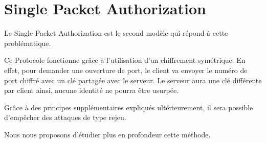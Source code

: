 \chapter{Single Packet Authorization}

Le Single Packet Authorization est le second modèle qui répond à cette problématique.

Ce Protocole fonctionne grâce à l'utilisation d'un chiffrement symétrique. En effet, pour demander une ouverture de port, le client va envoyer le numéro de port chiffré avec un clé partagée avec le serveur. Le serveur aura une clé différente par client ainsi, aucune identité ne pourra être usurpée.

Grâce à des principes supplémentaires expliqués ultérieurement, il sera possible d'empêcher des attaques de type rejeu.

Nous nous proposons d'étudier plus en profondeur cette méthode.
